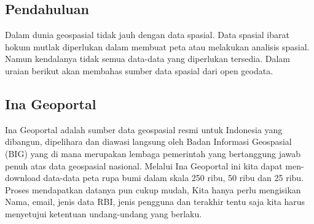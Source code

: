 \subsection{Pendahuluan}
Dalam dunia geospasial tidak jauh dengan data spasial. Data spasial ibarat hokum mutlak diperlukan dalam membuat peta atau melakukan analisis spasial. Namun kendalanya tidak semua data-data yang diperlukan tersedia. Dalam uraian berikut akan membahas sumber data spasial dari open geodata.

\subsection{Ina Geoportal}
Ina Geoportal adalah sumber data geospasial resmi untuk Indonesia yang  dibangun, dipelihara dan diawasi langsung oleh Badan Informasi Geospasial (BIG) yang di mana merupakan lembaga pemerintah yang bertanggung jawab penuh atas data geospasial nasional. Melalui Ina Geoportal ini kita dapat men-download data-data peta rupa bumi dalam skala 250 ribu, 50 ribu dan 25 ribu. Proses mendapatkan datanya pun cukup mudah, Kita hanya perlu mengisikan Nama, email, jenis data RBI, jenis pengguna dan terakhir tentu saja kita harus menyetujui ketentuan undang-undang yang berlaku. 
